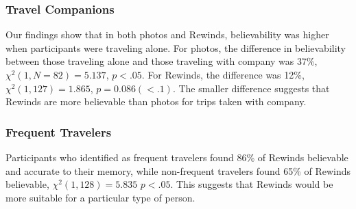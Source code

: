 \documentclass{sigchi}
\begin{document}

\subsubsection{Travel Companions}
Our findings show that in both photos and Rewinds, believability was higher when participants were traveling alone. For photos, the difference in believability between those traveling alone and those traveling with company was 37\%, $\chi^2(1, N=82) = 5.137$, $p < .05$. For Rewinds, the difference was 12\%, $\chi^2(1, 127) = 1.865$, $p = 0.086 (<.1)$. The smaller difference suggests that Rewinds are more believable than photos for trips taken with company.

\subsubsection{Frequent Travelers}
Participants who identified as frequent travelers found 86\% of Rewinds believable and accurate to their memory, while non-frequent travelers found 65\% of Rewinds believable, $\chi^2(1, 128) = 5.835$
$p < .05$. This suggests that Rewinds would be more suitable for a particular type of person.
\end{document}
